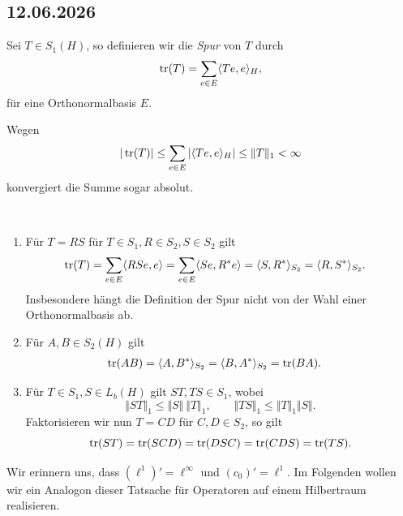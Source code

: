 \subsection*{12.06.2026}

\begin{definition}
    Sei $T \in S_1(H)$, so definieren wir die \emph{Spur} von $T$ durch
    \[
        \operatorname*{tr} (T) = \sum_{e \in E} \langle Te, e \rangle_H,
    \]
    für eine Orthonormalbasis $E$.
\end{definition}

Wegen
\[
    \vert \operatorname*{tr}(T) \vert
    \leq
    \sum_{e \in E} \vert \langle Te, e \rangle_H \vert
    \leq
    \Vert T \Vert_1
    <
    \infty
\]
konvergiert die Summe sogar absolut.

\begin{remark}{\ }
    \begin{enumerate}
        \item Für $T = RS$ für $T \in S_1, R \in S_2, S \in S_2$ gilt
        \begin{align*}
            \operatorname*{tr}(T)
            &=
            \sum_{e \in E} \langle RS e, e \rangle
            =
            \sum_{e \in E} \langle Se, R^* e \rangle
            =
            \langle S, R^* \rangle_{S_2}
            =
            \langle R, S^* \rangle_{S_2}.
        \end{align*}
        Insbesondere hängt die Definition der Spur nicht von der Wahl einer Orthonormalbasis ab.

        \item Für $A, B \in S_2(H)$ gilt
        \begin{align*}
            \operatorname*{tr}(AB)
            &=
            \langle A, B^* \rangle_{S_2}
            =
            \langle B, A^* \rangle_{S_2}
            =
            \operatorname*{tr}(BA).
        \end{align*}

        \item Für $T \in S_1, S \in L_b(H)$ gilt $ST, TS \in S_1$, wobei
        \[
            \Vert ST \Vert_1 \leq \Vert S \Vert \ \Vert T \Vert_1,
            \qquad
            \Vert TS \Vert_1 \leq \Vert T \Vert_1 \Vert S \Vert.
        \]
        Faktorisieren wir nun $T = CD$ für $C, D \in S_2$, so gilt
        \[
            \operatorname*{tr}(ST) = \operatorname*{tr}(SCD) = \operatorname*{tr}(DSC) = \operatorname*{tr}(CDS) = \operatorname*{tr}(TS).
        \]
    \end{enumerate}
\end{remark}

Wir erinnern uns, dass $(\ell^1)' = \ell^\infty$ und $(c_0)' = \ell^1$. Im Folgenden wollen wir ein Analogon dieser Tatsache für Operatoren auf einem Hilbertraum realisieren.


